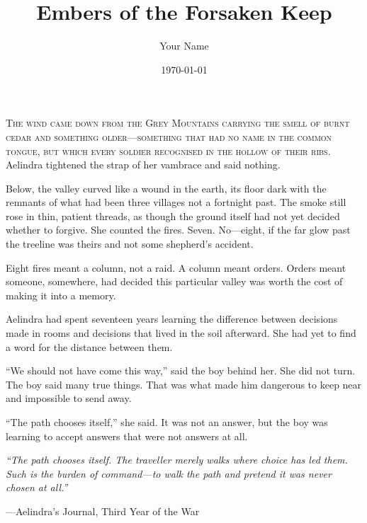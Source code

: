 \documentclass[openany,11pt]{book}
\title{Embers of the Forsaken Keep}
\author{Your Name}
\date{\today}
\begin{document}




\lettrine[lines=3]{T}{he wind came down from the Grey Mountains carrying the smell of burnt cedar and something older—something that had no name in the common tongue, but which every soldier recognised in the hollow of their ribs.} Aelindra tightened the strap of her vambrace and said nothing.

Below, the valley curved like a wound in the earth, its floor dark with the remnants of what had been three villages not a fortnight past. The smoke still rose in thin, patient threads, as though the ground itself had not yet decided whether to forgive. She counted the fires. Seven. No—eight, if the far glow past the treeline was theirs and not some shepherd's accident.

Eight fires meant a column, not a raid. A column meant orders. Orders meant someone, somewhere, had decided this particular valley was worth the cost of making it into a memory.

\scenebreak

Aelindra had spent seventeen years learning the difference between decisions made in rooms and decisions that lived in the soil afterward. She had yet to find a word for the distance between them.

``We should not have come this way,'' said the boy behind her. She did not turn. The boy said many true things. That was what made him dangerous to keep near and impossible to send away.

``The path chooses itself,'' she said. It was not an answer, but the boy was learning to accept answers that were not answers at all.

\begin{quotebox}
  \textit{``The path chooses itself. The traveller merely walks where choice has led them. Such is the burden of command—to walk the path and pretend it was never chosen at all.''}
  
  \hfill—Aelindra's Journal, Third Year of the War
\end{quotebox}
\end{document}
